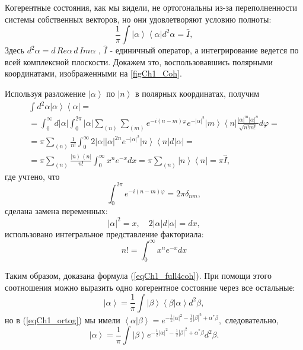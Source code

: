 Когерентные состояния, как мы видели, не ортогональны из-за
переполненности системы собственных векторов, но они удовлетворяют
условию полноты: 
\begin{equation}
\frac{1}{\pi}\int \left|\alpha\right>\left<\alpha\right| d^2 \alpha =
\hat{I},
\label{eqCh1_full4coh}
\end{equation}
Здесь $d^2 \alpha = d\, Re \alpha\, d\, Im \alpha$ , $\hat{I}$ - единичный
оператор, а интегрирование ведется по всей комплексной
плоскости. Докажем это, воспользовавшись полярными координатами,
изображенными на \autoref{figCh1_Coh}.  



Используя разложение $\left|\alpha\right>$ по $\left|n\right>$ в
полярных координатах, получим 
\begin{eqnarray}
\int d^2 \alpha \left|\alpha\right>\left<\alpha\right| =
\nonumber \\
=
\int_0^{\infty} d \left|\alpha\right|\int_0^{2
  \pi}\left|\alpha\right|\sum_{(n)}\sum_{(m)}e^{-i \left(n -
  m\right)\varphi}
e^{-\left|\alpha\right|^2}\left|m\right>\left<n\right|
\frac{\left|\alpha\right|^m \left|\alpha\right|^n}{\sqrt{n! m!}} d\varphi
= 
\nonumber \\
= \pi \sum_{(n)}\frac{1}{n!}\int_0^{\infty} 2
\left|\alpha\right|\left|\alpha\right|^{2n} e^{-\left|\alpha\right|^2} 
\left|n\right>\left<n\right|
d\left|\alpha\right| = 
\nonumber \\
=
\pi
\sum_{(n)}\frac{\left|n\right>\left<n\right|}{n!} \int_0^{\infty}x^n
e^{-x}dx = 
\pi \sum_{(n)}\left|n\right>\left<n\right| = \pi \hat{I},
\end{eqnarray}
где учтено, что
\[
\int_0^{2\pi} e^{-i \left(n - m\right)\varphi} = 2 \pi \delta_{nm},
\]
сделана замена переменных:  
\[
\left|\alpha\right|^2 = x, \quad 2 \left|\alpha\right| d
\left|\alpha\right| = d x,
\]
использовано интегральное представление факториала:
\[
n! = \int_0^{\infty}x^ne^{-x}dx
\]

Таким образом, доказана формула (\ref{eqCh1_full4coh}). При помощи
этого соотношения можно выразить одно когерентное состояние через все
остальные: 
\[
\left|\alpha\right> = \frac{1}{\pi}\int\left|\beta\right>\left<\beta\right|\left.\alpha\right> d^2 \beta,
\]
но в (\ref{eqCh1_ortog}) мы имели
\(
\left<\alpha\right|\left.\beta\right> = 
e^{
-\frac{1}{2} \left|\alpha\right|^2  -\frac{1}{2} \left|\beta\right|^2
+
\alpha^{*} \beta
},
\)
следовательно,
\begin{equation}
\left|\alpha\right> = \frac{1}{\pi}\int\left|\beta\right>
e^{
-\frac{1}{2} \left|\alpha\right|^2  -\frac{1}{2} \left|\beta\right|^2
+
\alpha^{*} \beta
} d^2 \beta.
\end{equation}
